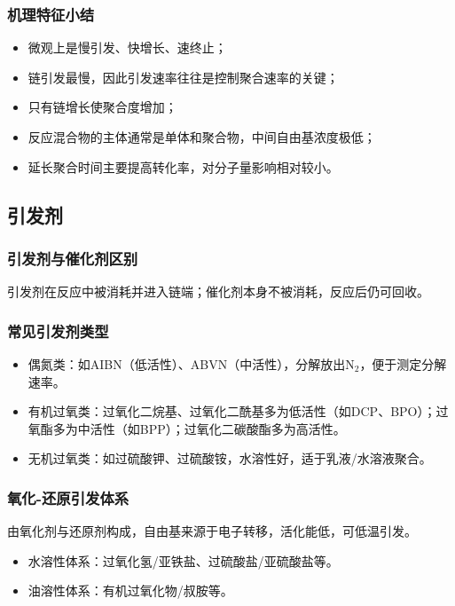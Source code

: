 ﻿\documentclass[12pt,a4paper]{article}
\begin{document}
\subsubsection{机理特征小结}
\begin{itemize}
  \item 微观上是慢引发、快增长、速终止；
  \item 链引发最慢，因此引发速率往往是控制聚合速率的关键；
  \item 只有链增长使聚合度增加；
  \item 反应混合物的主体通常是单体和聚合物，中间自由基浓度极低；
  \item 延长聚合时间主要提高转化率，对分子量影响相对较小。
\end{itemize}

\subsection{引发剂}
\subsubsection{引发剂与催化剂区别}
引发剂在反应中被消耗并进入链端；催化剂本身不被消耗，反应后仍可回收。

\subsubsection{常见引发剂类型}
\begin{itemize}
  \item 偶氮类：如AIBN（低活性）、ABVN（中活性），分解放出$\mathrm{N_2}$，便于测定分解速率。
  \item 有机过氧类：过氧化二烷基、过氧化二酰基多为低活性（如DCP、BPO）；过氧酯多为中活性（如BPP）；过氧化二碳酸酯多为高活性。
  \item 无机过氧类：如过硫酸钾、过硫酸铵，水溶性好，适于乳液/水溶液聚合。
\end{itemize}

\subsubsection{氧化-还原引发体系}
由氧化剂与还原剂构成，自由基来源于电子转移，活化能低，可低温引发。
\begin{itemize}
  \item 水溶性体系：过氧化氢/亚铁盐、过硫酸盐/亚硫酸盐等。
  \item 油溶性体系：有机过氧化物/叔胺等。
\end{itemize}
\end{document}
